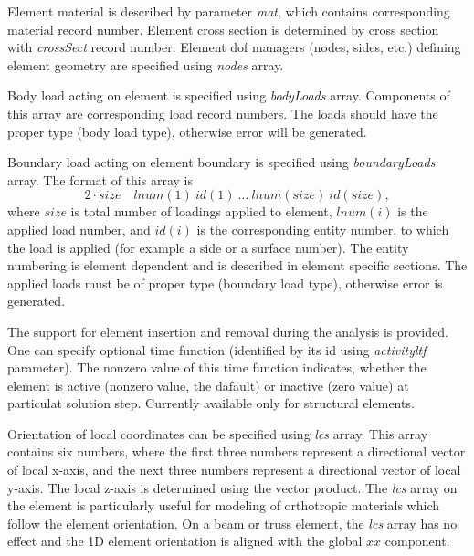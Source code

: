 \documentclass[a4paper]{article}
\newcommand{\param}[1]{{\em #1}}
\begin{document}
Element
material is described by parameter \param{mat}, which contains corresponding
material record number. Element cross
section is determined by cross section  with  \param{crossSect}
record number. Element dof managers (nodes, sides, etc.) defining element geometry are specified using
\param{nodes} array.

Body load acting on element is specified using \param{bodyLoads} array. Components
of this array are corresponding load record numbers. The loads should
have the proper type (body load type), otherwise error will be generated.

Boundary load acting on element boundary is specified using
\param{boundaryLoads} array. The format of this array is
\begin{displaymath}
2\cdot size \quad lnum(1)~id(1)~\dots~lnum(size)~id(size),
\end{displaymath}
where $size$ is total number of loadings applied to element,
$lnum(i)$ is the applied load number, and $id(i)$
is the corresponding entity number, to which the load is applied (for example
a side or a surface number). The entity numbering is element dependent and
is described in element specific sections. The applied loads must be
of proper type (boundary load type), otherwise error is generated.

The support for element insertion and removal during the analysis is provided. One can specify optional time function (identified by its id using \param{activityltf} parameter). The nonzero value of this time function indicates, whether the element is active (nonzero value, the dafault) or inactive (zero value) at particulat solution step. Currently available only for structural elements.

Orientation of local coordinates can be specified using \param{lcs} array. This array contains six numbers,
where the first three numbers represent a directional vector of local
x-axis, and the next three numbers represent a directional vector of local
y-axis. The local z-axis is determined using the vector product. The \param{lcs} array on the element is particularly useful for modeling of orthotropic materials which follow the element orientation. On a beam or truss element, the \param{lcs} array has no effect and the 1D element orientation is aligned with the global $xx$ component.
\end{document}
